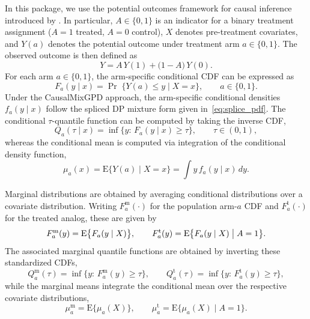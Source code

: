\documentclass[preprint,12pt,authoryear]{elsarticle}
\newcommand{\pkg}[1]{\textsf{#1}}
\begin{document}
In this package, we use the potential outcomes framework for causal inference introduced by
\citet{Rubin1974}. In particular, $A\in\{0,1\}$
is an indicator for a binary treatment assignment ($A=1$ treated, $A=0$
control), $X$ denotes pre-treatment covariates, and $Y(a)$ denotes the
potential outcome under treatment arm $a\in\{0,1\}$.  The observed outcome is then defined as
\begin{equation*}
Y = A\,Y(1) + \bigl(1-A\bigr)\,Y(0).
\end{equation*}
For each arm $a\in\{0,1\}$, the arm-specific conditional CDF
can be expressed as
\begin{equation*}
F_a(y\mid x)=\Pr\;\{Y(a)\le y \mid X=x\},\qquad a\in\{0,1\}.
\end{equation*}
Under the \pkg{CausalMixGPD} approach, the arm-specific conditional
densities $f_a(y\mid x)$ follow the spliced DP mixture form
given in~\eqref{eq:splice_pdf}.  The conditional $\tau$-quantile function can be computed by taking the inverse CDF,
\begin{equation*}
Q_a(\tau\mid x)=\inf\{y:\,F_a(y\mid x)\ge \tau\},\qquad \tau\in(0,1),
\end{equation*}
whereas the conditional mean is computed via integration of the conditional
density function,
\begin{equation*}
\mu_a(x)=\mathrm{E}\{Y(a)\mid X=x\}=\int y\, f_a(y\mid x)\,dy.
\end{equation*}


Marginal distributions are obtained by averaging
conditional distributions over a covariate distribution.  Writing
$F_a^{\mathrm{m}}(\cdot)$ for the population arm-$a$ CDF and
$F_a^{\mathrm{t}}(\cdot)$ for the treated analog, these are given by
\begin{equation*}
F_a^{\mathrm{m}}(y)=\mathrm{E}\bigl\{F_a(y\mid X)\bigr\},
\qquad
F_a^{\mathrm{t}}(y)=\mathrm{E}\bigl\{F_a(y\mid X)\bigm\vert A=1\bigr\}.
\end{equation*}
The associated marginal quantile functions are obtained by inverting
these standardized CDFs,
\begin{equation*}
Q_a^{\mathrm{m}}(\tau)=\inf\{y:\,F_a^{\mathrm{m}}(y)\ge \tau\},
\qquad
Q_a^{\mathrm{t}}(\tau)=\inf\{y:\,F_a^{\mathrm{t}}(y)\ge \tau\},
\end{equation*}
while the marginal means integrate the conditional mean over the
respective covariate distributions,
\begin{equation*}
\mu_a^{\mathrm{m}}=\mathrm{E}\bigl\{\mu_a(X)\bigr\},
\qquad
\mu_a^{\mathrm{t}}=\mathrm{E}\bigl\{\mu_a(X)\mid A=1\bigr\}.
\end{equation*}
\end{document}
